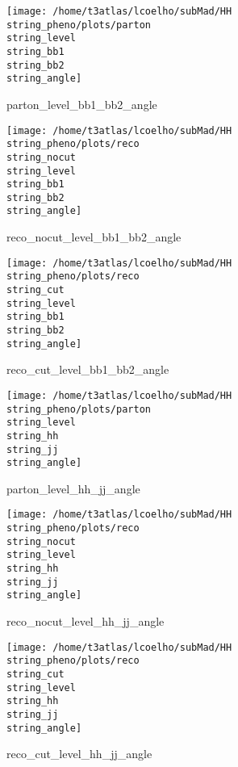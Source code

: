 \documentclass[a4paper,onecolumn,final,11pt]{article}
\begin{document}
\begin{figure}[H] 
\centering 
\begin{minipage}{.32\textwidth} 
        \centering 
        \hspace{0cm} 
        \texttt{[image: /home/t3atlas/lcoelho/subMad/HH\\string\_pheno/plots/parton\\string\_level\\string\_bb1\\string\_bb2\\string\_angle]} 
        \caption{parton_level_bb1_bb2_angle} 
\end{minipage} 
\hfill 
\begin{minipage}{.32\textwidth} 
        \centering 
        \hspace{0cm} 
    \texttt{[image: /home/t3atlas/lcoelho/subMad/HH\\string\_pheno/plots/reco\\string\_nocut\\string\_level\\string\_bb1\\string\_bb2\\string\_angle]} 
        \caption{reco_nocut_level_bb1_bb2_angle} 
\end{minipage} 
\hfill 
\begin{minipage}{.32\textwidth} 
        \centering 
        \hspace{0cm} 
    \texttt{[image: /home/t3atlas/lcoelho/subMad/HH\\string\_pheno/plots/reco\\string\_cut\\string\_level\\string\_bb1\\string\_bb2\\string\_angle]} 
        \caption{reco_cut_level_bb1_bb2_angle} 
\end{minipage} 
\end{figure} 
 
\begin{figure}[H] 
\centering 
\begin{minipage}{.32\textwidth} 
        \centering 
        \hspace{0cm} 
        \texttt{[image: /home/t3atlas/lcoelho/subMad/HH\\string\_pheno/plots/parton\\string\_level\\string\_hh\\string\_jj\\string\_angle]} 
        \caption{parton_level_hh_jj_angle} 
\end{minipage} 
\hfill 
\begin{minipage}{.32\textwidth} 
        \centering 
        \hspace{0cm} 
    \texttt{[image: /home/t3atlas/lcoelho/subMad/HH\\string\_pheno/plots/reco\\string\_nocut\\string\_level\\string\_hh\\string\_jj\\string\_angle]} 
        \caption{reco_nocut_level_hh_jj_angle} 
\end{minipage} 
\hfill 
\begin{minipage}{.32\textwidth} 
        \centering 
        \hspace{0cm} 
    \texttt{[image: /home/t3atlas/lcoelho/subMad/HH\\string\_pheno/plots/reco\\string\_cut\\string\_level\\string\_hh\\string\_jj\\string\_angle]} 
        \caption{reco_cut_level_hh_jj_angle} 
\end{minipage} 
\end{figure} 
 
\end{document}
